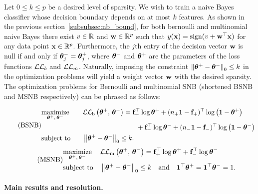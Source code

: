 Let $0 \leq k \leq p$ be a desired level of sparsity.
We wish to train a naive Bayes classifier whose decision boundary depends on at most $k$ features.
As shown in the previous section~\ref{subsubsec:nb_bound},
for both bernoulli and multinomial naive Bayes
there exist $v \in \mathbb{R}$ and $\mathbf{w} \in \mathbb{R}^p$ such that $y(\mathbf{x}) = \operatorname*{sign}(v + \mathbf{w}^\top\mathbf{x})$ for any data point $\mathbf{x}\in\mathbb{R}^p$.
Furthermore, the $j$th entry of the decision vector $\mathbf{w}$ is null if and only if $\bm{\theta}^-_j = \bm{\theta}^+_j$,
where $\bm{\theta}^-$ and $\bm{\theta}^+$ are the parameters of the loss functions $\mathcal{L}\mathcal{L}_b$ and $\mathcal{L}\mathcal{L}_m$.
Naturally, imposing the constraint $\left\lVert\bm{\theta}^+ - \bm{\theta}^-\right\rVert_0 \leq k$ in the optimization problems
will yield a weight vector $\mathbf{w}$ with the desired sparsity.
The optimization problems for Bernoulli and multinomial SNB
(shortened BSNB and MSNB respectively) can be phrased as follows:

\begin{equation}\label{eq:bsnb}\tag{BSNB}
\begin{aligned}
    & \underset{\bm{\theta}^+,\, \bm{\theta}^-}{\text{maximize}}
    \quad&&\mathcal{L}\mathcal{L}_\text{b}\left( \bm{\theta}^+,\, \bm{\theta}^- \right)
    = \mathbf{f}_+^\top\log\bm{\theta}^+ + (n_+\mathbf{1} - \mathbf{f}_+)^\top\log\left( \mathbf{1} - \bm{\theta}^+ \right)\\
    & && \qquad\qquad\qquad\qquad + \mathbf{f}_-^\top\log\bm{\theta}^- + (n_-\mathbf{1} - \mathbf{f}_-)^\top\log\left( \mathbf{1} - \bm{\theta}^- \right)\\
    & \text{subject to}
    &&\left\lVert\bm{\theta}^+ - \bm{\theta}^-\right\rVert_0 \leq k.
\end{aligned}
\end{equation}
\vspace{0.25cm}
\begin{equation}\label{eq:msnb}\tag{MSNB}
\begin{aligned}
    & \underset{\bm{\theta}^+,\, \bm{\theta}^-}{\text{maximize}}
    & & \mathcal{L}\mathcal{L}_\text{m}\left( \bm{\theta}^+,\, \bm{\theta}^- \right) = \mathbf{f}_+^\top\log\bm{\theta}^+ + \mathbf{f}_-^\top\log\bm{\theta}^-\\
    & \text{subject to}
    & & \left\lVert\bm{\theta}^+ - \bm{\theta}^-\right\rVert_0 \leq k
    \quad\text{and}\quad \mathbf{1}^\top\bm{\theta}^+ = \mathbf{1}^\top\bm{\theta}^- = 1.
\end{aligned}
\end{equation}

\paragraph{Main results and resolution.}\label{subsubsec:snb_th}

